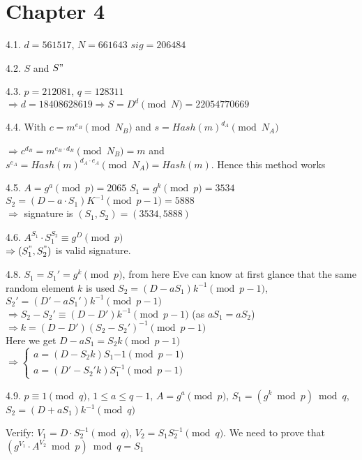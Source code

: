 \section*{Chapter 4}

4.1.	 $d = 561517$, $N=661643$
		 $sig = 206484$
	


4.2. $S$ and $S"$


4.3. $p = 212081$, $q=128311$ \\ $\Rightarrow d = 18408628619 \Rightarrow S = D^d \pmod N = 22054770669$


4.4. With $c = m^{e_B} \pmod{N_B}$ and $s = Hash(m)^{d_A} \pmod{N_A}$

$\Rightarrow c^{d_B} = m^{e_B\cdot d_B} \pmod{N_B} = m$ and $s^{e_A} = Hash(m)^{d_A \cdot e_A} \pmod{N_A} = Hash(m)$. Hence this method works


4.5.
		 $A = g^a \pmod p = 2065$
		 $S_1 = g^k \pmod p = 3534$ \\ $S_2 = (D-a\cdot S_1)K^{-1} \pmod{p-1} = 5888$ \\ $\Rightarrow$ signature is $(S_1, S_2) = (3534, 5888)$
	


4.6. $A^{S_1} \cdot S_1^{S_2} \equiv g^D \pmod p$ \\ $\Rightarrow (S_1^", S_2^")$ is valid signature.


4.8.
		 $S_1 = S_1' = g^k \pmod p$, from here Eve can know at first glance that the same random element $k$ is used
		 $S_2 = (D-aS_1)k^{-1} \pmod{p-1}$, $S_2' = (D'-aS_1')k^{-1} \pmod{p-1}$ \\ $\Rightarrow S_2 - S_2' \equiv (D - D')k^{-1} \pmod{p-1}$ (as $aS_1 = aS_2$) \\ $\Rightarrow k = (D-D')(S_2-S_2')^{-1} \pmod{p-1}$ \\ Here we get $D - aS_1 = S_2 k \pmod{p-1}$ \\ $\Rightarrow \begin{cases}
			a = (D - S_2 k) S_1{-1} \pmod{p-1} \\ a = (D'-S_2' k) S_1^{-1} \pmod{p-1}
		\end{cases}$
	


4.9. $p \equiv 1 \pmod q$, $1 \leq a \leq q-1$, $A=g^a \pmod p$, $S_1 = (g^k \bmod p) \bmod q$, $S_2 = (D + aS_1) k^{-1} \pmod q$
	
	Verify: $V_1 = D \cdot S_2^{-1} \pmod q$, $V_2 = S_1 S_2^{-1} \pmod q$. We need to prove that $(g^{V_1} \cdot A^{V_2} \bmod p) \bmod q = S_1$
	
